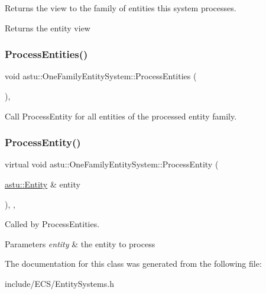 Returns the view to the family of entities this system processes.

\begin{DoxyReturn}{Returns}
the entity view 
\end{DoxyReturn}
\mbox{\label{classastu_1_1OneFamilyEntitySystem_a6d2343f720abd99abe1f41f7601776f5}} 
\subsubsection{\texorpdfstring{Process\+Entities()}{ProcessEntities()}}
{\footnotesize\ttfamily void astu\+::\+One\+Family\+Entity\+System\+::\+Process\+Entities (\begin{DoxyParamCaption}{ }\end{DoxyParamCaption})\hspace{0.3cm}{\ttfamily [inline]}, {\ttfamily [protected]}}

Call {\ttfamily Process\+Entity} for all entities of the processed entity family. \mbox{\label{classastu_1_1OneFamilyEntitySystem_ad91b51933676ed72e45142e98ca27025}} 
\subsubsection{\texorpdfstring{Process\+Entity()}{ProcessEntity()}}
{\footnotesize\ttfamily virtual void astu\+::\+One\+Family\+Entity\+System\+::\+Process\+Entity (\begin{DoxyParamCaption}\item[{\hyperlink{classastu_1_1Entity}{astu\+::\+Entity} \&}]{entity }\end{DoxyParamCaption})\hspace{0.3cm}{\ttfamily [inline]}, {\ttfamily [protected]}, {\ttfamily [virtual]}}

Called by \textquotesingle{}Process\+Entities\textquotesingle{}.


\begin{DoxyParams}{Parameters}
{\em entity} & the entity to process \\
\hline
\end{DoxyParams}


The documentation for this class was generated from the following file\+:\begin{DoxyCompactItemize}
\item 
include/\+E\+C\+S/Entity\+Systems.\+h\end{DoxyCompactItemize}
